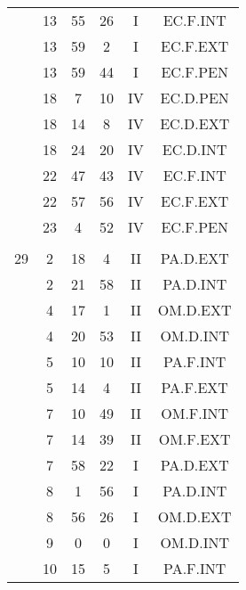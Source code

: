\documentclass[12pt, a4paper]{article}
\begin{document}
\begin{multicols}{3}
{\begin{tabular}{c c c c c c}
	 	 	 	 & 13 & 55 & 26 & I & EC.F.INT\\%
	 	 	 	 & 13 & 59 & 2 & I & EC.F.EXT\\%
	 	 	 	 & 13 & 59 & 44 & I & EC.F.PEN\\%
	 	 	 	 & 18 & 7 & 10 & IV & EC.D.PEN\\%
	 	 	 	 & 18 & 14 & 8 & IV & EC.D.EXT\\%
	 	 	 	 & 18 & 24 & 20 & IV & EC.D.INT\\%
	 	 	 	 & 22 & 47 & 43 & IV & EC.F.INT\\%
	 	 	 	 & 22 & 57 & 56 & IV & EC.F.EXT\\%
	 	 	 	 & 23 & 4 & 52 & IV & EC.F.PEN\\%
	 	 	 	 & & & & & \\%
	 	 	 	29 & 2 & 18 & 4 & II & PA.D.EXT\\%
	 	 	 	 & 2 & 21 & 58 & II & PA.D.INT\\%
	 	 	 	 & 4 & 17 & 1 & II & OM.D.EXT\\%
	 	 	 	 & 4 & 20 & 53 & II & OM.D.INT\\%
	 	 	 	 & 5 & 10 & 10 & II & PA.F.INT\\%
	 	 	 	 & 5 & 14 & 4 & II & PA.F.EXT\\%
	 	 	 	 & 7 & 10 & 49 & II & OM.F.INT\\%
	 	 	 	 & 7 & 14 & 39 & II & OM.F.EXT\\%
	 	 	 	 & 7 & 58 & 22 & I & PA.D.EXT\\%
	 	 	 	 & 8 & 1 & 56 & I & PA.D.INT\\%
	 	 	 	 & 8 & 56 & 26 & I & OM.D.EXT\\%
	 	 	 	 & 9 & 0 & 0 & I & OM.D.INT\\%
	 	 	 	 & 10 & 15 & 5 & I & PA.F.INT\\%

\end{tabular}}
\end{multicols}
\end{document}
